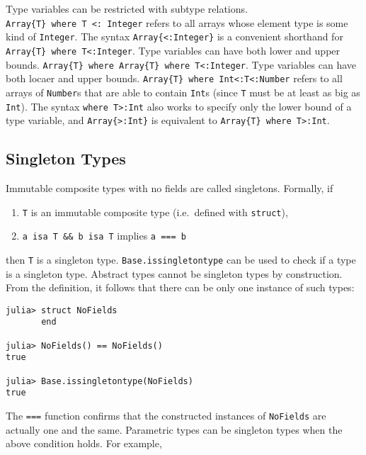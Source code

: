 \documentclass[
]{article}
\providecommand{\tightlist}{%
  \setlength{\itemsep}{0pt}\setlength{\parskip}{0pt}}
\begin{document}
Type variables can be restricted with subtype relations.
\texttt{Array\{T\}\ where\ T\ \textless{}:\ Integer} refers to all
arrays whose element type is some kind of \texttt{Integer}. The syntax
\texttt{Array\{\textless{}:Integer\}} is a convenient shorthand for
\texttt{Array\{T\}\ where\ T\textless{}:Integer}. Type variables can
have both lower and upper bounds.
\texttt{Array\{T\}\ where\ Array\{T\}\ where\ T\textless{}:Integer}.
Type variables can have both locaer and upper bounds.
\texttt{Array\{T\}\ where\ Int\textless{}:T\textless{}:Number} refers to
all arrays of \texttt{Number}s that are able to contain \texttt{Int}s
(since \texttt{T} must be at least as big as \texttt{Int}). The syntax
\texttt{where\ T\textgreater{}:Int} also works to specify only the lower
bound of a type variable, and \texttt{Array\{\textgreater{}:Int\}} is
equivalent to \texttt{Array\{T\}\ where\ T\textgreater{}:Int}.

\hypertarget{singleton-types}{%
\subsection{Singleton Types}\label{singleton-types}}

Immutable composite types with no fields are called singletons.
Formally, if

\begin{enumerate}
\def\labelenumi{\arabic{enumi}.}
\tightlist
\item
  \texttt{T} is an immutable composite type (i.e.~defined with
  \texttt{struct}),
\item
  \texttt{a\ isa\ T\ \&\&\ b\ isa\ T} implies \texttt{a\ ===\ b}
\end{enumerate}

then \texttt{T} is a singleton type. \texttt{Base.issingletontype} can
be used to check if a type is a singleton type. Abstract types cannot be
singleton types by construction. From the definition, it follows that
there can be only one instance of such types:

\begin{verbatim}
julia> struct NoFields
       end

julia> NoFields() == NoFields()
true

julia> Base.issingletontype(NoFields)
true
\end{verbatim}

The \texttt{===} function confirms that the constructed instances of
\texttt{NoFields} are actually one and the same. Parametric types can be
singleton types when the above condition holds. For example,
\end{document}
